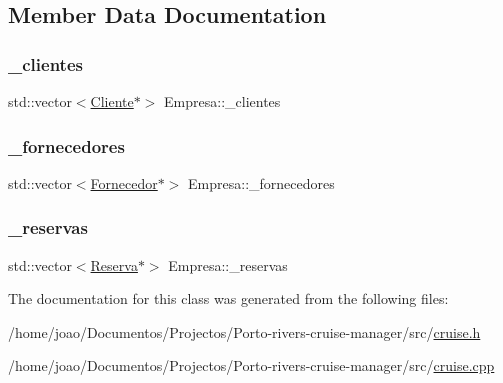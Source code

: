 \subsection{Member Data Documentation}
\mbox{\label{classEmpresa_a82ee7236b9de27ed7192b193cb9f7b1f}} 
\subsubsection{\texorpdfstring{\+\_\+clientes}{\_clientes}}
{\footnotesize\ttfamily std\+::vector$<$\hyperlink{classCliente}{Cliente}$\ast$$>$ Empresa\+::\+\_\+clientes\hspace{0.3cm}{\ttfamily [private]}}

\mbox{\label{classEmpresa_a535f4cd93e7aec4983e1abce799708e7}} 
\subsubsection{\texorpdfstring{\+\_\+fornecedores}{\_fornecedores}}
{\footnotesize\ttfamily std\+::vector$<$\hyperlink{classFornecedor}{Fornecedor}$\ast$$>$ Empresa\+::\+\_\+fornecedores\hspace{0.3cm}{\ttfamily [private]}}

\mbox{\label{classEmpresa_a310a7271e2da4281af00cc5e80baf250}} 
\subsubsection{\texorpdfstring{\+\_\+reservas}{\_reservas}}
{\footnotesize\ttfamily std\+::vector$<$\hyperlink{classReserva}{Reserva}$\ast$$>$ Empresa\+::\+\_\+reservas\hspace{0.3cm}{\ttfamily [private]}}



The documentation for this class was generated from the following files\+:\begin{DoxyCompactItemize}
\item 
/home/joao/\+Documentos/\+Projectos/\+Porto-\/rivers-\/cruise-\/manager/src/\hyperlink{cruise_8h}{cruise.\+h}\item 
/home/joao/\+Documentos/\+Projectos/\+Porto-\/rivers-\/cruise-\/manager/src/\hyperlink{cruise_8cpp}{cruise.\+cpp}\end{DoxyCompactItemize}
